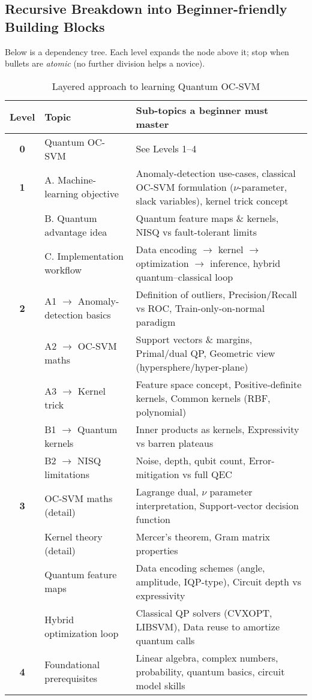 \documentclass[11pt,a4paper]{article}
\begin{document}
	\subsection{Recursive Breakdown into Beginner-friendly Building Blocks}
	
	Below is a dependency tree. Each level expands the node above it; stop when bullets are \emph{atomic} (no further division helps a novice).
	
	\begin{table}[h]
		\centering
		\renewcommand{\arraystretch}{1.2}
		\begin{tabular}{|c|l|l|}
			\hline
			\textbf{Level} & \textbf{Topic} & \textbf{Sub-topics a beginner must master} \\
			\hline
			\textbf{0} & Quantum OC-SVM & See Levels 1–4 \\
			\hline
			\textbf{1} & A. Machine-learning objective & Anomaly-detection use-cases, classical OC-SVM formulation ($\nu$-parameter, slack variables), kernel trick concept \\
			\hline
			& B. Quantum advantage idea & Quantum feature maps \& kernels, NISQ vs fault-tolerant limits \\
			\hline
			& C. Implementation workflow & Data encoding $\rightarrow$ kernel $\rightarrow$ optimization $\rightarrow$ inference, hybrid quantum–classical loop \\
			\hline
			\textbf{2} & A1 $\rightarrow$ Anomaly-detection basics & Definition of outliers, Precision/Recall vs ROC, Train-only-on-normal paradigm \\
			\hline
			& A2 $\rightarrow$ OC-SVM maths & Support vectors \& margins, Primal/dual QP, Geometric view (hypersphere/hyper-plane) \\
			\hline
			& A3 $\rightarrow$ Kernel trick & Feature space concept, Positive-definite kernels, Common kernels (RBF, polynomial) \\
			\hline
			& B1 $\rightarrow$ Quantum kernels & Inner products as kernels, Expressivity vs barren plateaus \\
			\hline
			& B2 $\rightarrow$ NISQ limitations & Noise, depth, qubit count, Error-mitigation vs full QEC \\
			\hline
			\textbf{3} & OC-SVM maths (detail) & Lagrange dual, $\nu$ parameter interpretation, Support-vector decision function \\
			\hline
			& Kernel theory (detail) & Mercer's theorem, Gram matrix properties \\
			\hline
			& Quantum feature maps & Data encoding schemes (angle, amplitude, IQP-type), Circuit depth vs expressivity \\
			\hline
			& Hybrid optimization loop & Classical QP solvers (CVXOPT, LIBSVM), Data reuse to amortize quantum calls \\
			\hline
			\textbf{4} & Foundational prerequisites & Linear algebra, complex numbers, probability, quantum basics, circuit model skills \\
			\hline
		\end{tabular}
		\caption{Layered approach to learning Quantum OC-SVM}
	\end{table}
	
\end{document}
